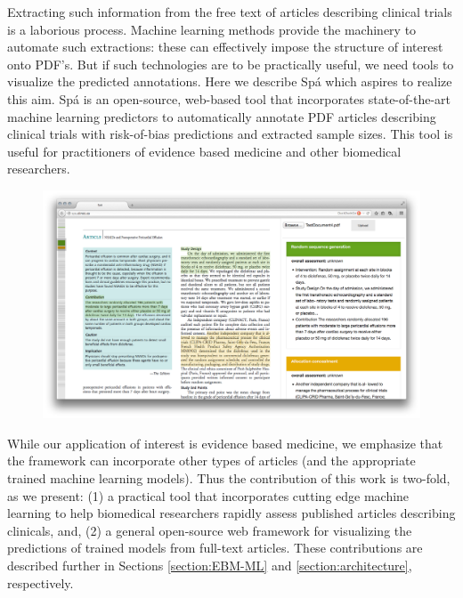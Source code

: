 \documentclass[runningheads,a4paper]{llncs}
\begin{document}

Extracting such information from the free text of articles describing clinical trials is a laborious process.
Machine learning methods provide the machinery to automate such extractions: these can effectively impose the structure of interest onto PDF's.
But if such technologies are to be practically useful, we need tools to visualize the predicted annotations.
Here we describe Spá which aspires to realize this aim.
Spá is an open-source, web-based tool that incorporates state-of-the-art machine learning predictors to automatically annotate PDF articles describing clinical trials with risk-of-bias predictions and extracted sample sizes.
This tool is useful for practitioners of evidence based medicine and other biomedical researchers.

\begin{figure}[htb]
\centering
\includegraphics[width=.9\linewidth]{./images/screenshot.png}
\end{figure}

While our application of interest is evidence based medicine, we emphasize that the framework can incorporate other types of articles (and the appropriate trained machine learning models).
Thus the contribution of this work is two-fold, as we present: (1) a practical tool that incorporates cutting edge machine learning to help biomedical researchers rapidly assess published articles describing clinicals, and, (2) a general open-source web framework for visualizing the predictions of trained models from full-text articles.
These contributions are described further in Sections \ref{section:EBM-ML} and \ref{section:architecture}, respectively.
\end{document}
